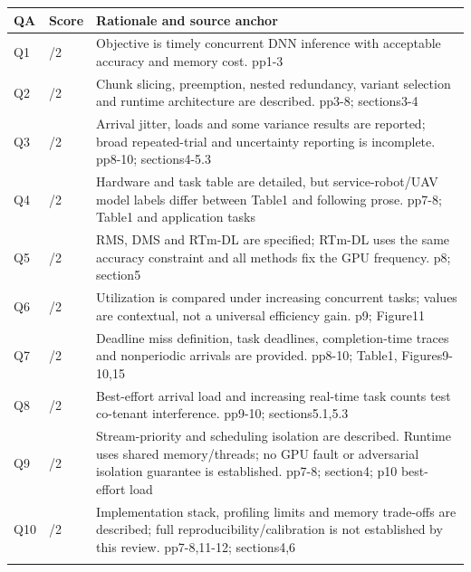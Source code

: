 \begin{longtable}{>{\raggedright\arraybackslash}p{}>{\raggedright\arraybackslash}p{}>{\raggedright\arraybackslash}p{}}
\toprule
\textbf{QA} & \textbf{Score} & \textbf{Rationale and source anchor}\\\midrule\endhead
Q1 & 2/2 & Objective is timely concurrent DNN inference with acceptable accuracy and memory cost. pp1-3\\\addlinespace
Q2 & 2/2 & Chunk slicing,\allowbreak{} preemption,\allowbreak{} nested redundancy,\allowbreak{} variant selection and runtime architecture are described. pp3-8;\allowbreak{} sections3-4\\\addlinespace
Q3 & 1/2 & Arrival jitter,\allowbreak{} loads and some variance results are reported;\allowbreak{} broad repeated-trial and uncertainty reporting is incomplete. pp8-10;\allowbreak{} sections4-5.3\\\addlinespace
Q4 & 1/2 & Hardware and task table are detailed,\allowbreak{} but service-robot/UAV model labels differ between Table1 and following prose. pp7-8;\allowbreak{} Table1 and application tasks\\\addlinespace
Q5 & 2/2 & RMS,\allowbreak{} DMS and RTm-DL are specified;\allowbreak{} RTm-DL uses the same accuracy constraint and all methods fix the GPU frequency. p8;\allowbreak{} section5\\\addlinespace
Q6 & 2/2 & Utilization is compared under increasing concurrent tasks;\allowbreak{} values are contextual,\allowbreak{} not a universal efficiency gain. p9;\allowbreak{} Figure11\\\addlinespace
Q7 & 2/2 & Deadline miss definition,\allowbreak{} task deadlines,\allowbreak{} completion-time traces and nonperiodic arrivals are provided. pp8-10;\allowbreak{} Table1,\allowbreak{} Figures9-10,\allowbreak{}15\\\addlinespace
Q8 & 2/2 & Best-effort arrival load and increasing real-time task counts test co-tenant interference. pp9-10;\allowbreak{} sections5.1,\allowbreak{}5.3\\\addlinespace
Q9 & 1/2 & Stream-priority and scheduling isolation are described. Runtime uses shared memory/threads;\allowbreak{} no GPU fault or adversarial isolation guarantee is established. pp7-8;\allowbreak{} section4;\allowbreak{} p10 best-effort load\\\addlinespace
Q10 & 1/2 & Implementation stack,\allowbreak{} profiling limits and memory trade-offs are described;\allowbreak{} full reproducibility/calibration is not established by this review. pp7-8,\allowbreak{}11-12;\allowbreak{} sections4,\allowbreak{}6\\\addlinespace
\bottomrule\end{longtable}
